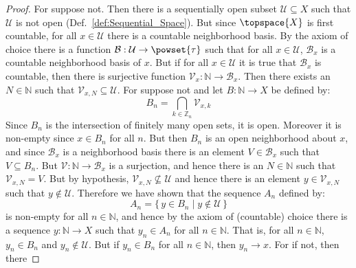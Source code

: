 \documentclass{article}                                                        %
\begin{document}
        \begin{proof}
            For suppose not. Then there is a sequentially open subset
            $\mathcal{U}\subseteq{X}$ such that $\mathcal{U}$ is not open
            (Def.~\ref{def:Sequential_Space}). But since $\topspace{X}$ is first
            countable, for all $x\in\mathcal{U}$ there is a countable
            neighborhood basis. By the axiom of choice there is a
            function $\mathcal{B}:\mathcal{U}\rightarrow\powset{\tau}$ such that
            for all $x\in\mathcal{U}$, $\mathcal{B}_{x}$ is a countable
            neighborhood basis of $x$. But if for all $x\in\mathcal{U}$ it is
            true that $\mathcal{B}_{x}$ is countable, then there is surjective
            function $\mathcal{V}_{x}:\mathbb{N}\rightarrow\mathcal{B}_{x}$.
            Then there exists an $N\in\mathbb{N}$ such that
            $\mathcal{V}_{x,N}\subseteq\mathcal{U}$. For suppose not and let
            $B:\mathbb{N}\rightarrow{X}$ be defined by:
            \begin{equation}
                B_{n}=\bigcap_{k\in\mathbb{Z}_{n}}\mathcal{V}_{x,k}
            \end{equation}
            Since $B_{n}$ is the intersection of finitely many open sets, it is
            open. Moreover it is non-empty since $x\in{B}_{n}$ for all $n$.
            But then $B_{n}$ is an open neighborhood about $x$, and since
            $\mathcal{B}_{x}$ is a neighborhood basis there is an element
            $V\in\mathcal{B}_{x}$ such that $V\subseteq{B}_{n}$. But
            $\mathcal{V}:\mathbb{N}\rightarrow\mathcal{B}_{x}$ is a surjection,
            and hence there is an $N\in\mathbb{N}$ such that
            $\mathcal{V}_{x,N}=V$. But by hypothesis,
            $\mathcal{V}_{x,N}\nsubseteq\mathcal{U}$ and hence there is an
            element $y\in\mathcal{V}_{x,N}$ such that $y\notin\mathcal{U}$.
            Therefore we have shown that the sequence $A_{n}$ defined by:
            \begin{equation}
                A_{n}=\{\,y\in{B}_{n}\;|\;y\not\in\mathcal{U}\,\}
            \end{equation}
            is non-empty for all $n\in\mathbb{N}$, and hence by the axiom of
            (countable) choice there is a sequence $y:\mathbb{N}\rightarrow{X}$
            such that $y_{n}\in{A}_{n}$ for all $n\in\mathbb{N}$. That is,
            for all $n\in\mathbb{N}$, $y_{n}\in{B}_{n}$ and
            $y_{n}\notin\mathcal{U}$. But if $y_{n}\in{B}_{n}$ for all
            $n\in\mathbb{N}$, then $y_{n}\rightarrow{x}$. For if not, then there

\end{proof}
\end{document}
